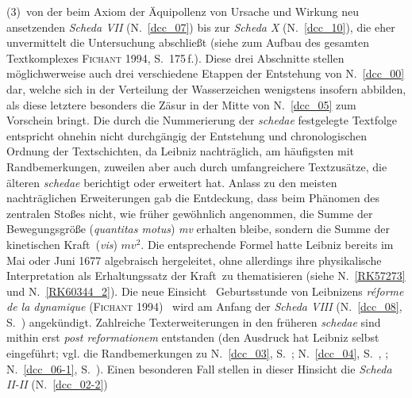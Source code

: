 (3)~von der beim Axiom der Äquipollenz von Ursache und Wirkung neu ansetzenden \textit{Scheda VII} (N.~\ref{dcc_07}) %
bis zur \textit{Scheda X} (N.~\ref{dcc_10}), %
die eher unvermittelt die Untersuchung abschließt (siehe zum Aufbau des gesamten Textkomplexes
\textsc{Fichant} 1994, S.~175\,f.).\cite{01056}
\pend%
\newpage
\pstart%
Diese drei Abschnitte stellen möglichwerweise auch drei verschiedene Etappen der Entstehung von N.~\ref{dcc_00} %
dar, welche sich in der Verteilung der Wasserzeichen wenigstens insofern abbilden, als diese letztere besonders die Zäsur in der Mitte von N.~\ref{dcc_05} %
zum Vorschein bringt.
\pend%
%
\pstart%
Die%
durch die Nummerierung der \textit{schedae} festgelegte Textfolge entspricht ohnehin nicht durchgängig der Entstehung und chronologischen Ordnung der Textschichten, da Leibniz nachträglich, am häufigsten mit Randbemerkungen, zuweilen aber auch durch umfangreichere Textzusätze, die älteren \textit{schedae} berichtigt oder erweitert hat.
Anlass zu den meisten nachträglichen Erweiterungen gab die \glqq Entdeckung\grqq, dass beim Phänomen des zentralen Stoßes nicht, wie früher gewöhnlich angenommen, die Summe der Bewegungsgröße (\textit{quantitas motus}) \textit{mv} erhalten bleibe, sondern die Summe der kinetischen \glqq Kraft\grqq\ (\textit{vis}) $mv^2.$
Die entsprechende Formel hatte Leibniz bereits im Mai oder Juni 1677 algebraisch hergeleitet, ohne allerdings ihre physikalische Interpretation als Erhaltungssatz der \glqq Kraft\grqq\ zu thematisieren (siehe N.~\ref{RK57273} und N.~\ref{RK60344_2}). %
Die neue Einsicht \textendash\ Geburtsstunde von Leibnizens \textit{réforme de la dynamique} (\textsc{Fichant} 1994\cite{01056}) \textendash\ wird am Anfang der \textit{Scheda VIII} (N.~\ref{dcc_08}, %
S.~) angekündigt. 
Zahlreiche Texterweiterungen in den früheren \textit{schedae} sind mithin erst %
\textit{post reformationem} entstanden (den Ausdruck hat Leibniz selbst eingeführt;
vgl. die Randbemerkungen zu
N.~\ref{dcc_03},
S.~;
N.~\ref{dcc_04},
S.~,
;
N.~\ref{dcc_06-1},
S.~).%
\pend%
%
\pstart%
Einen besonderen Fall stellen in dieser Hinsicht die \textit{Scheda II-II} (N.~\ref{dcc_02-2}) %
